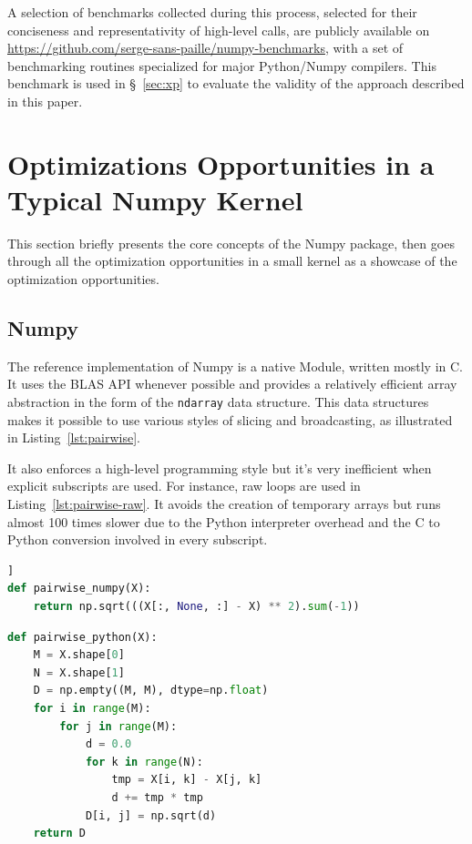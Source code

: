 \documentclass[10pt, preprint]{sigplanconf}
\begin{document}
A selection of benchmarks collected during this process, selected for their
conciseness and representativity of high-level calls, are publicly available on
\url{https://github.com/serge-sans-paille/numpy-benchmarks}, with a set of
benchmarking routines specialized for major Python/Numpy compilers. This
benchmark is used in \S~\ref{sec:xp} to evaluate the validity of the approach
described in this paper.


\section{Optimizations Opportunities in a Typical Numpy Kernel}
\label{sec:optimize}

This section briefly presents the core concepts of the Numpy package, then goes
through all the optimization opportunities in a small kernel as a showcase of
the optimization opportunities.

\subsection{Numpy}

The reference implementation of Numpy is a native Module, written mostly in C.
It uses the BLAS API whenever possible and provides a relatively efficient array
abstraction in the form of the \texttt{ndarray} data structure. This data
structures makes it possible to use various styles of slicing and broadcasting,
as illustrated in Listing~\ref{lst:pairwise}.

It also enforces a high-level programming style but it's very inefficient when
explicit subscripts are used.  For instance, raw loops are used in
Listing~\ref{lst:pairwise-raw}. It avoids the creation of temporary arrays but
runs almost 100 times slower due to the Python interpreter overhead and the C
to Python conversion involved in every subscript.

\begin{lstlisting}[language=python, caption={\textit{pairwise} function that
  exhibits array broadcasting.}, label={lst:pairwise}, breaklines=true]]
def pairwise_numpy(X):
    return np.sqrt(((X[:, None, :] - X) ** 2).sum(-1))
\end{lstlisting}


\begin{lstlisting}[language=python, caption={\textit{pairwise} function
  using raw loops.}, label={lst:pairwise-raw}]
def pairwise_python(X):
    M = X.shape[0]
    N = X.shape[1]
    D = np.empty((M, M), dtype=np.float)
    for i in range(M):
        for j in range(M):
            d = 0.0
            for k in range(N):
                tmp = X[i, k] - X[j, k]
                d += tmp * tmp
            D[i, j] = np.sqrt(d)
    return D
\end{lstlisting}
\end{document}
